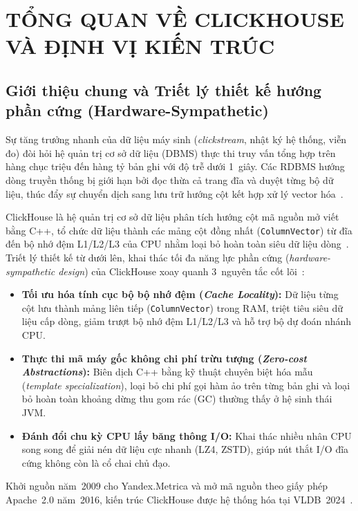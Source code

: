 \documentclass[13pt,a4paper]{report}
\begin{document}
{\setlength{\parskip}{0pt}
\listoftables
\vspace{0.3cm}
\listoffigures
}
\clearpage

\setcounter{page}{1}

\chapter{TỔNG QUAN VỀ CLICKHOUSE VÀ ĐỊNH VỊ KIẾN TRÚC}

\section{Giới thiệu chung và Triết lý thiết kế hướng phần cứng (Hardware-Sympathetic)}
Sự tăng trưởng nhanh của dữ liệu máy sinh (\textit{clickstream}, nhật ký hệ thống, viễn đo) đòi hỏi hệ quản trị cơ sở dữ liệu (DBMS) thực thi truy vấn tổng hợp trên hàng chục triệu đến hàng tỷ bản ghi với độ trễ dưới 1~giây. Các RDBMS hướng dòng truyền thống bị giới hạn bởi đọc thừa cả trang đĩa và duyệt từng bộ dữ liệu, thúc đẩy sự chuyển dịch sang lưu trữ hướng cột kết hợp xử lý vector hóa~\cite{A1, A2}.

ClickHouse là hệ quản trị cơ sở dữ liệu phân tích hướng cột mã nguồn mở viết bằng C++, tổ chức dữ liệu thành các mảng cột đồng nhất (\texttt{ColumnVector}) từ đĩa đến bộ nhớ đệm L1/L2/L3 của CPU nhằm loại bỏ hoàn toàn siêu dữ liệu dòng~\cite{A1}. Triết lý thiết kế từ dưới lên, khai thác tối đa năng lực phần cứng (\textit{hardware-sympathetic design}) của ClickHouse xoay quanh 3~nguyên tắc cốt lõi~\cite{A1}:
\begin{itemize}
    \setlength{\itemsep}{3pt}\setlength{\parskip}{0pt}\setlength{\parsep}{0pt}
    \item \textbf{Tối ưu hóa tính cục bộ bộ nhớ đệm (\textit{Cache Locality}):} Dữ liệu từng cột lưu thành mảng liên tiếp (\texttt{ColumnVector}) trong RAM, triệt tiêu siêu dữ liệu cấp dòng, giảm trượt bộ nhớ đệm L1/L2/L3 và hỗ trợ bộ dự đoán nhánh CPU.
    \item \textbf{Thực thi mã máy gốc không chi phí trừu tượng (\textit{Zero-cost Abstractions}):} Biên dịch C++ bằng kỹ thuật chuyên biệt hóa mẫu (\textit{template specialization}), loại bỏ chi phí gọi hàm ảo trên từng bản ghi và loại bỏ hoàn toàn khoảng dừng thu gom rác (GC) thường thấy ở hệ sinh thái JVM.
    \item \textbf{Đánh đổi chu kỳ CPU lấy băng thông I/O:} Khai thác nhiều nhân CPU song song để giải nén dữ liệu cực nhanh (LZ4, ZSTD), giúp nút thắt I/O đĩa cứng không còn là cổ chai chủ đạo.
\end{itemize} Khởi nguồn năm~2009 cho Yandex.Metrica và mở mã nguồn theo giấy phép Apache~2.0 năm~2016, kiến trúc ClickHouse được hệ thống hóa tại VLDB~2024~\cite{A1, A4}.
\end{document}
